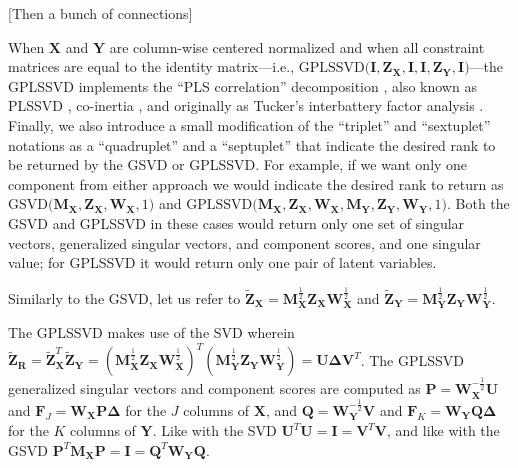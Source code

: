 \documentclass[12pt]{article}
\begin{document}
{[}Then a bunch of connections{]}

When \({\mathbf X}\) and \({\mathbf Y}\) are column-wise centered
normalized and when all constraint matrices are equal to the identity
matrix---i.e.,
\(\mathrm{GPLSSVD(} {\mathbf I}, {\mathbf Z}_{\mathbf X}, {\mathbf I}, {\mathbf I}, {\mathbf Z}_{\mathbf Y}, {\mathbf I} \mathrm{)}\)---the
GPLSSVD implements the ``PLS correlation'' decomposition
\citep{krishnan_partial_2011, bookstein1994partial, mcintosh_spatial_1996},
also known as PLSSVD \citep{tenenhaus_regression_1998}, co-inertia
\citep[\citet{dray2014}]{doledec1994}, and originally as Tucker's
interbattery factor analysis \citep{tucker_inter-battery_1958}. Finally,
we also introduce a small modification of the ``triplet'' and
``sextuplet'' notations as a ``quadruplet'' and a ``septuplet'' that
indicate the desired rank to be returned by the GSVD or GPLSSVD. For
example, if we want only one component from either approach we would
indicate the desired rank to return as
\(\mathrm{GSVD(} {\mathbf M}_{{\mathbf X}}, {\mathbf Z}_{\mathbf X}, {\mathbf W}_{{\mathbf X}}, 1 \mathrm{)}\)
and
\(\mathrm{GPLSSVD(} {\mathbf M}_{\mathbf X}, {\mathbf Z}_{\mathbf X}, {\mathbf W}_{\mathbf X}, {\mathbf M}_{\mathbf Y}, {\mathbf Z}_{\mathbf Y}, {\mathbf W}_{\mathbf Y}, 1 \mathrm{)}\).
Both the GSVD and GPLSSVD in these cases would return only one set of
singular vectors, generalized singular vectors, and component scores,
and one singular value; for GPLSSVD it would return only one pair of
latent variables.

Similarly to the GSVD, let us refer to
\(\widetilde{{\mathbf Z}}_{\mathbf X} = {\mathbf M}_{\mathbf X}^{\frac{1}{2}}{\mathbf Z}_{\mathbf X}{\mathbf W}_{\mathbf X}^{\frac{1}{2}}\)
and
\(\widetilde{{\mathbf Z}}_{\mathbf Y} = {\mathbf M}_{\mathbf Y}^{\frac{1}{2}}{\mathbf Z}_{\mathbf Y}{\mathbf W}_{\mathbf Y}^{\frac{1}{2}}\).

The GPLSSVD makes use of the SVD wherein
\(\widetilde{\mathbf Z}_{\mathbf R} = \widetilde{{\mathbf Z}}_{\mathbf X}^{T}\widetilde{{\mathbf Z}}_{\mathbf Y} = ({\mathbf M}_{\mathbf X}^{\frac{1}{2}}{\mathbf Z}_{\mathbf X}{\mathbf W}_{\mathbf X}^{\frac{1}{2}})^{T}({\mathbf M}_{\mathbf Y}^{\frac{1}{2}}{\mathbf Z}_{\mathbf Y}{\mathbf W}_{\mathbf Y}^{\frac{1}{2}}) = {\mathbf U} {\boldsymbol \Delta} {\mathbf V}^{T}\).
The GPLSSVD generalized singular vectors and component scores are
computed as
\({\mathbf P} = {\mathbf W}_{{\mathbf X}}^{-\frac{1}{2}}{\mathbf U}\)
and
\({\mathbf F}_{J} = {\mathbf W}_{{\mathbf X}}{\mathbf P}{\boldsymbol \Delta}\)
for the \(J\) columns of \({\mathbf X}\), and
\({\mathbf Q} = {\mathbf W}_{{\mathbf Y}}^{-\frac{1}{2}}{\mathbf V}\)
and
\({\mathbf F}_{K} = {\mathbf W}_{{\mathbf Y}}{\mathbf Q}{\boldsymbol \Delta}\)
for the \(K\) columns of \({\mathbf Y}\). Like with the SVD
\({\mathbf U}^{T}{\mathbf U} = {\mathbf I} = {\mathbf V}^{T}{\mathbf V}\),
and like with the GSVD
\({\mathbf P}^{T}{\mathbf M}_{\mathbf X}{\mathbf P} = {\mathbf I} = {\mathbf Q}^{T}{\mathbf W}_{\mathbf Y}{\mathbf Q}\).
\end{document}

